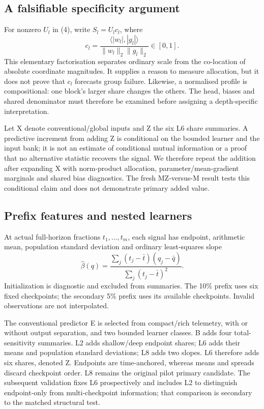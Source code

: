 \subsection{A falsifiable specificity argument}
For nonzero $U_l$ in (4), write $S_l=U_l c_l$, where
\begin{equation}
c_l=\frac{\langle|w_l|,|g_l|\rangle}{\|w_l\|_2\|g_l\|_2}\in[0,1].
\tag{5}\end{equation}
This elementary factorisation separates ordinary scale from the co-location of absolute coordinate magnitudes. It supplies a reason to measure allocation, but it does not prove that $c_l$ forecasts group failure. Likewise, a normalised profile is compositional: one block's larger share changes the others. The head, biases and shared denominator must therefore be examined before assigning a depth-specific interpretation.

Let X denote conventional/global inputs and Z the six L6 share summaries. A predictive increment from adding Z is conditional on the bounded learner and the input bank; it is not an estimate of conditional mutual information or a proof that no alternative statistic recovers the signal. We therefore repeat the addition after expanding X with norm-product allocation, parameter/mean-gradient marginals and shared bias diagnostics. The fresh MZ-versus-M result tests this conditional claim and does not demonstrate primary added value.

\subsection{Prefix features and nested learners}
At actual full-horizon fractions $t_1,\ldots,t_m$, each signal has endpoint, arithmetic mean, population standard deviation and ordinary least-squares slope
\begin{equation}
\widehat\beta(q)=\frac{\sum_j(t_j-\bar t)(q_j-\bar q)}{\sum_j(t_j-\bar t)^2}.
\label{eq:slope}
\tag{6}\end{equation}
Initialization is diagnostic and excluded from summaries. The 10\% prefix uses six fixed checkpoints; the secondary 5\% prefix uses its available checkpoints. Invalid observations are not interpolated.

The conventional predictor E is selected from compact/rich telemetry, with or without output separation, and two bounded learner classes. B adds four total-sensitivity summaries. L2 adds shallow/deep endpoint shares; L6 adds their means and population standard deviations; L8 adds two slopes. L6 therefore adds six shares, denoted Z. Endpoints are time-anchored, whereas means and spreads discard checkpoint order. L8 remains the original pilot primary candidate. The subsequent validation fixes L6 prospectively and includes L2 to distinguish endpoint-only from multi-checkpoint information; that comparison is secondary to the matched structural test.

